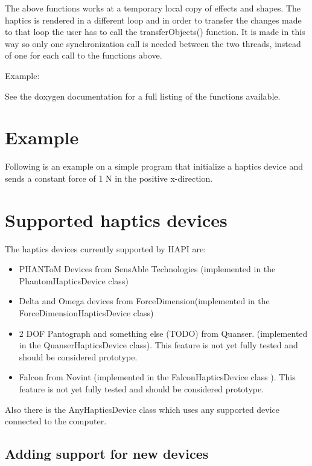 The above functions works at a temporary local copy of effects and
shapes. The haptics is rendered in a different loop and in order to
transfer the changes made to that loop the user has to call the
transferObjects() function. It is made in this way so only one
synchronization call is needed between the two threads, instead of one
for each call to the functions above.

Example:



See the doxygen documentation for a full listing of the functions
available. 

\section{Example}
Following is an example on a simple program that initialize a haptics
device and sends a constant force of 1 N in the positive x-direction.

 

\section{Supported haptics devices}
The haptics devices currently supported by HAPI are:

\begin{itemize}
\item PHANToM Devices from SensAble Technologies (implemented in the
  PhantomHapticsDevice class)
\item Delta and Omega devices from ForceDimension(implemented in the
  ForceDimensionHapticsDevice class)
\item 2 DOF Pantograph and something else (TODO) from Quanser.
 (implemented in the QuanserHapticsDevice class). This feature is not yet fully
 tested and should be considered prototype.
\item Falcon from Novint (implemented in the FalconHapticsDevice class ). 
This feature is not yet fully tested and should be considered prototype.
\end{itemize}

Also there is the AnyHapticsDevice class which uses any supported
device connected to the computer.

\subsection{Adding support for new devices}
\label{ssAddingHapticsSupport}

